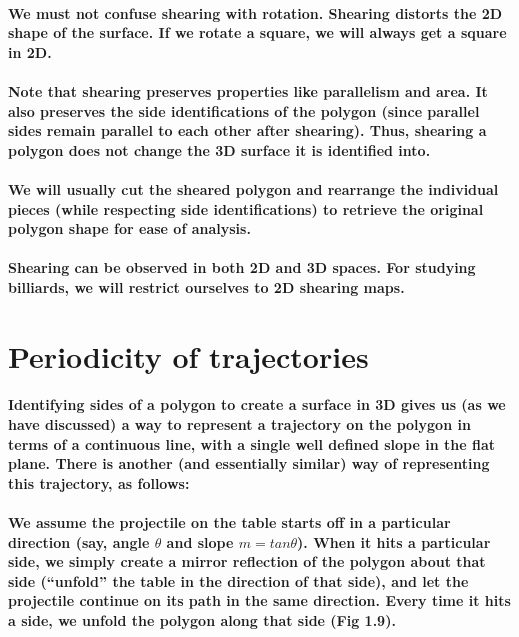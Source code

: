 \documentclass{article}
\begin{document}
\paragraph{We must not confuse shearing with rotation. Shearing distorts the 2D shape of the surface. If we rotate a square, we will always get a square in 2D.}

\paragraph{Note that shearing preserves properties like parallelism and area. It also preserves the side identifications of the polygon (since parallel sides remain parallel to each other after shearing). Thus, shearing a polygon does not change the 3D surface it is identified into.}

\paragraph{We will usually cut the sheared polygon and rearrange the individual pieces (while respecting side identifications) to retrieve the original polygon shape for ease of analysis.}

\paragraph{Shearing can be observed in both 2D and 3D spaces. For studying billiards, we will restrict ourselves to 2D shearing maps.}



\section{Periodicity of trajectories}

\paragraph{Identifying sides of a polygon to create a surface in 3D gives us (as we have discussed) a way to represent a trajectory on the polygon in terms of a continuous line, with a single well defined slope in the flat plane. There is another (and essentially similar) way of representing this trajectory, as follows:}

\paragraph{We assume the projectile on the table starts off in a particular direction (say, angle $\theta$ and slope $m = tan\theta$). When it hits a particular side, we simply create a mirror reflection of the polygon about that side (“unfold” the table in the direction of that side), and let the projectile continue on its path in the same direction. Every time it hits a side, we unfold the polygon along that side (Fig 1.9).}
\end{document}
